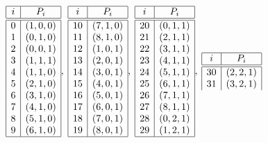 {\renewcommand*{\arraystretch}{1.5}
$$
\begin{array}{|c|c|}
\hline
i & P_{i}\\
\hline
\hline
0 & ( 1, 0, 0 )\\
1 & ( 0, 1, 0 )\\
2 & ( 0, 0, 1 )\\
3 & ( 1, 1, 1 )\\
4 & ( 1, 1, 0 )\\
5 & ( 2, 1, 0 )\\
6 & ( 3, 1, 0 )\\
7 & ( 4, 1, 0 )\\
8 & ( 5, 1, 0 )\\
9 & ( 6, 1, 0 )\\
\hline
\end{array}
, \;
\begin{array}{|c|c|c|}
\hline
i & P_{i}\\
\hline
\hline
10 & ( 7, 1, 0 )\\
11 & ( 8, 1, 0 )\\
12 & ( 1, 0, 1 )\\
13 & ( 2, 0, 1 )\\
14 & ( 3, 0, 1 )\\
15 & ( 4, 0, 1 )\\
16 & ( 5, 0, 1 )\\
17 & ( 6, 0, 1 )\\
18 & ( 7, 0, 1 )\\
19 & ( 8, 0, 1 )\\
\hline
\end{array}
, \;
\begin{array}{|c|c|c|}
\hline
i & P_{i}\\
\hline
\hline
20 & ( 0, 1, 1 )\\
21 & ( 2, 1, 1 )\\
22 & ( 3, 1, 1 )\\
23 & ( 4, 1, 1 )\\
24 & ( 5, 1, 1 )\\
25 & ( 6, 1, 1 )\\
26 & ( 7, 1, 1 )\\
27 & ( 8, 1, 1 )\\
28 & ( 0, 2, 1 )\\
29 & ( 1, 2, 1 )\\
\hline
\end{array}
, \;
\begin{array}{|c|c|c|}
\hline
i & P_{i}\\
\hline
\hline
30 & ( 2, 2, 1 )\\
31 & ( 3, 2, 1 )\\

\end{array}$$}
